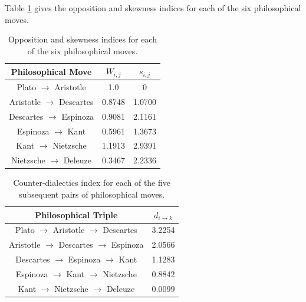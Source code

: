 \documentclass[%
 aip,
 jmp,%
 amsmath,amssymb,
 reprint,%
]{revtex4-1}
\begin{document}


Table \ref{tab:tableOI} gives the opposition and skewness indices
for each of the six philosophical moves.


\begin{table}%
\caption{\label{tab:tableOI}Opposition and skewness indices for each
of the six philosophical moves.  }

\begin{tabular}{|c||c|c|}
\hline
Philosophical Move & $W_{i,j}$ & $s_{i,j}$ \\
\hline \hline
Plato $\rightarrow$ Aristotle     & 1.0    & 0 \\
Aristotle $\rightarrow$ Descartes & 0.8748 & 1.0700 \\
Descartes $\rightarrow$ Espinoza  & 0.9081 & 2.1161 \\
Espinoza $\rightarrow$ Kant       & 0.5961 & 1.3673 \\
Kant $\rightarrow$ Nietzsche      & 1.1913 & 2.9391 \\
Nietzsche $\rightarrow$ Deleuze   & 0.3467 & 2.2336 \\
\hline
\end{tabular}
\end{table}

\begin{table}%
\caption{\label{tab:tableE} Counter-dialectics index for each
of the five subsequent pairs of philosophical moves.  }


\begin{tabular}{|c||c|}
\hline
Philosophical Triple & $d_{i \rightarrow k}$ \\
\hline \hline
Plato $\rightarrow$ Aristotle $\rightarrow$ Descartes &  3.2254 \\
Aristotle $\rightarrow$ Descartes $\rightarrow$ Espinoza & 2.0566 \\
Descartes $\rightarrow$ Espinoza $\rightarrow$ Kant & 1.1283 \\
Espinoza $\rightarrow$ Kant $\rightarrow$ Nietzsche & 0.8842 \\
Kant $\rightarrow$ Nietzsche $\rightarrow$ Deleuze  & 0.0099 \\
\hline
\end{tabular}
\end{table}
\end{document}
